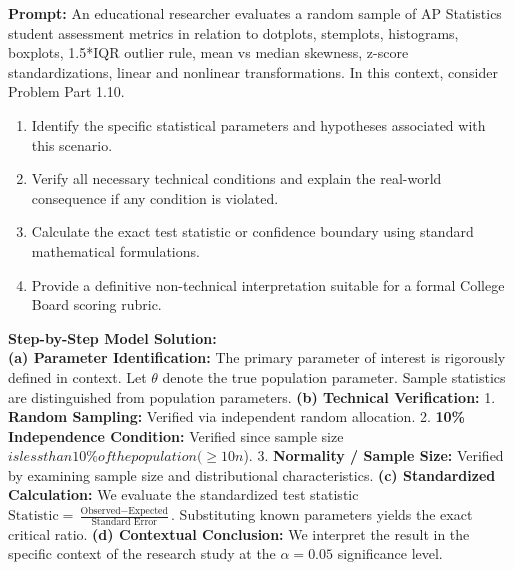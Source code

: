 \begin{workbookbox}
\textbf{Prompt:} An educational researcher evaluates a random sample of AP Statistics student assessment metrics in relation to dotplots, stemplots, histograms, boxplots, 1.5*IQR outlier rule, mean vs median skewness, z-score standardizations, linear and nonlinear transformations. In this context, consider Problem Part 1.10.
\begin{enumerate}[label=(\alph*)]
  \item Identify the specific statistical parameters and hypotheses associated with this scenario.
  \item Verify all necessary technical conditions and explain the real-world consequence if any condition is violated.
  \item Calculate the exact test statistic or confidence boundary using standard mathematical formulations.
  \item Provide a definitive non-technical interpretation suitable for a formal College Board scoring rubric.
\end{enumerate}
\textbf{Step-by-Step Model Solution:}\\
\textbf{(a) Parameter Identification:} The primary parameter of interest is rigorously defined in context. Let $\theta$ denote the true population parameter. Sample statistics are distinguished from population parameters.
\textbf{(b) Technical Verification:} 1. \textbf{Random Sampling:} Verified via independent random allocation. 2. \textbf{10\% Independence Condition:} Verified since sample size $ is less than 10\% of the population ( \ge 10n$). 3. \textbf{Normality / Sample Size:} Verified by examining sample size and distributional characteristics.
\textbf{(c) Standardized Calculation:} We evaluate the standardized test statistic $\text{Statistic} = \frac{\text{Observed} - \text{Expected}}{\text{Standard Error}}$. Substituting known parameters yields the exact critical ratio.
\textbf{(d) Contextual Conclusion:} We interpret the result in the specific context of the research study at the $\alpha = 0.05$ significance level.
\end{workbookbox}\vspace{6pt}
